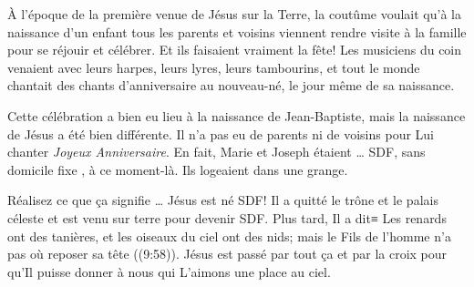 


À l'époque de la première venue de Jésus sur la Terre, la coutûme voulait qu'à la naissance d'un enfant tous les parents et voisins viennent rendre visite à la famille pour se réjouir et célébrer. Et ils faisaient vraiment la fête! Les musiciens du coin venaient avec leurs harpes, leurs lyres, leurs tambourins, et tout le monde chantait des chants d'anniversaire au nouveau-né, le jour même de sa naissance.

Cette célébration a bien eu lieu à la naissance de Jean-Baptiste, mais la naissance de Jésus a été bien différente. Il n'a pas eu de parents ni de voisins pour Lui chanter \emph{Joyeux Anniversaire}. En fait, Marie et Joseph étaient … SDF, \og sans domicile fixe \fg{}, à ce moment-là. Ils logeaient dans une grange.

Réalisez ce que ça signifie … Jésus est né SDF! Il a quitté le trône et le palais céleste et est venu sur terre pour devenir SDF. Plus tard, Il a dit≡ \og Les renards ont des tanières, et les oiseaux du ciel ont des nids; mais le Fils de l’homme n’a pas où reposer sa tête \fg{} ((9:58)). Jésus est passé par tout ça \ocadr et par la croix \fcadr{} pour qu'Il puisse donner à nous qui L'aimons une place au ciel.

